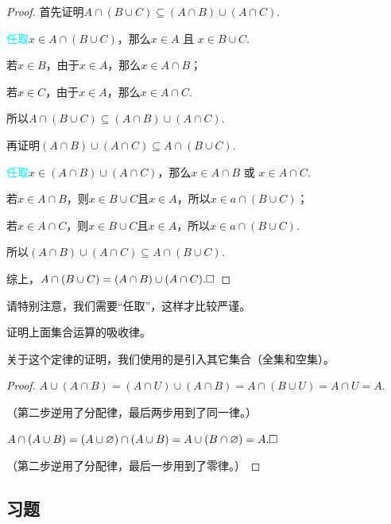 \documentclass[lang=cn,math=cm,chinesefont=nofont,11pt,scheme=chinese,twocol]{elegantbook}
\begin{document}
\begin{proof}
  首先证明$A\cap(B\cup C)\subseteq(A\cap B)\cup(A\cap C)$.

  \textcolor{cyan}{任取}\enspace$x\in A\cap(B\cup C)$，那么$x\in A\text{ 且 }x\in B\cup C$.

  若$x\in B$，由于$x\in A$，那么$x\in A\cap B$；

  若$x\in C$，由于$x\in A$，那么$x\in A\cap C$.

  所以$A\cap(B\cup C)\subseteq(A\cap B)\cup(A\cap C)$.

  \hspace*{\fill}

  再证明$(A\cap B)\cup(A\cap C)\subseteq A\cap(B\cup C)$.

  \textcolor{cyan}{任取}\enspace$x\in (A\cap B)\cup(A\cap C)$，那么$x\in A\cap B\text{ 或 }x\in A\cap C$.

  若$x\in A\cap B$，则$x\in B\cup C\text{且}x\in A$，所以$x\in a\cap(B\cup C)$；

  若$x\in A\cap C$，则$x\in B\cup C\text{且}x\in A$，所以$x\in a\cap(B\cup C)$.

  所以$(A\cap B)\cup(A\cap C)\subseteq A\cap(B\cup C)$.

  综上，$A\cap(B\cup C)=(A\cap B)\cup(A\cap C).\hfill\square$
\end{proof}
\begin{remark}
  请特别注意，我们需要“任取”，这样才比较严谨。
\end{remark}

\hspace*{\fill}

\begin{example}
  证明上面集合运算的吸收律。
\end{example}
关于这个定律的证明，我们使用的是引入其它集合（全集和空集）。

\begin{proof}
  $A\cup (A\cap B)=(A\cap U)\cup(A\cap B)=A\cap(B\cup U)=A\cap U=A.$

  （第二步逆用了分配律，最后两步用到了同一律。）

  $A\cap(A\cup B)=(A\cup\varnothing)\cap(A\cup B)=A\cup(B\cap\varnothing)=A.\hfill\square$

  （第二步逆用了分配律，最后一步用到了零律。）
\end{proof}

\subsection{习题}
\end{document}
